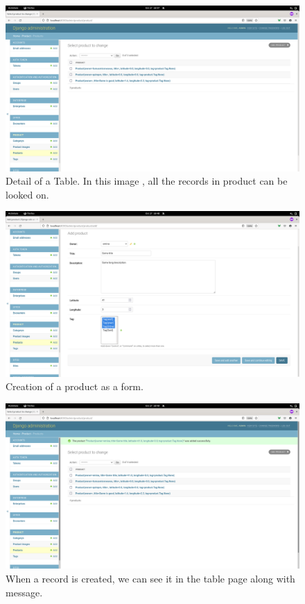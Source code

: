 \documentclass[./main.tex]{subfiles}
\begin{document}
\begin{figure}[H]
	\centering
	\includegraphics[width=0.9\linewidth]{img/admin-img-3.png}
	\caption{Detail of a Table. In this image , all the records in product can be looked on.}
	\label{fig:admin-3}
\end{figure}

\begin{figure}[H]
	\centering
	\includegraphics[width=0.9\linewidth]{img/admin-img-4.png}
	\caption{Creation of a product as a form.}
	\label{fig:admin-4}
\end{figure}

\begin{figure}[H]
	\centering
	\includegraphics[width=0.9\linewidth]{img/admin-img-5.png}
	\caption{When a record is created, we can see it in the table page along with message.}
	\label{fig:admin-5}
\end{figure}
\end{document}
